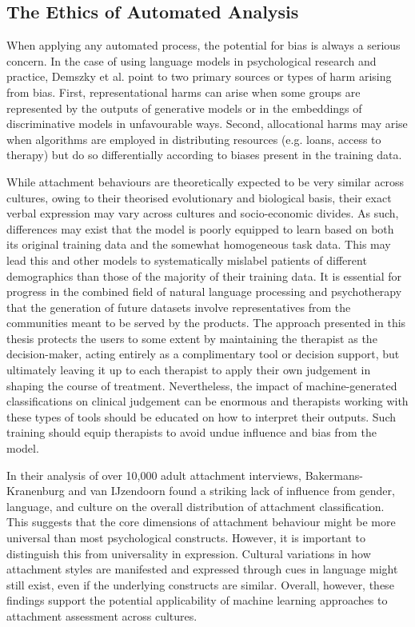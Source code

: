 \documentclass[12pt]{report}
\begin{document}
\subsection{The Ethics of Automated Analysis}
When applying any automated process, the potential for bias is always a serious concern.
In the case of using language models in psychological research and practice, Demszky et al. \citeyear{Demszky2023} point to two primary sources or types of harm arising from bias.
First, representational harms can arise when some groups are represented by the outputs of generative models or in the embeddings of discriminative models in unfavourable ways.
Second, allocational harms may arise when algorithms are employed in distributing resources (e.g. loans, access to therapy) but do so differentially according to biases present in the training data.

While attachment behaviours are theoretically expected to be very similar across cultures, owing to their theorised evolutionary and biological basis, their exact verbal expression may vary across cultures and socio-economic divides.
As such, differences may exist that the model is poorly equipped to learn based on both its original training data and the somewhat homogeneous task data.
This may lead this and other models to systematically mislabel patients of different demographics than those of the majority of their training data.
It is essential for progress in the combined field of natural language processing and psychotherapy that the generation of future datasets involve representatives from the communities meant to be served by the products.
The approach presented in this thesis protects the users to some extent by maintaining the therapist as the decision-maker, acting entirely as a complimentary tool or decision support, but ultimately leaving it up to each therapist to apply their own judgement in shaping the course of treatment.
Nevertheless, the impact of machine-generated classifications on clinical judgement can be enormous and therapists working with these types of tools should be educated on how to interpret their outputs.
Such training should equip therapists to avoid undue influence and bias from the model.

In their analysis of over 10,000 adult attachment interviews, Bakermans-Kranenburg and van IJzendoorn \citeyear{Bakermanskranenburg2009} found a striking lack of influence from gender, language, and culture on the overall distribution of attachment classification.
This suggests that the core dimensions of attachment behaviour might be more universal than most psychological constructs.
However, it is important to distinguish this from universality in expression.
Cultural variations in how attachment styles are manifested and expressed through cues in language might still exist, even if the underlying constructs are similar.
Overall, however, these findings support the potential applicability of machine learning approaches to attachment assessment across cultures.
\end{document}
